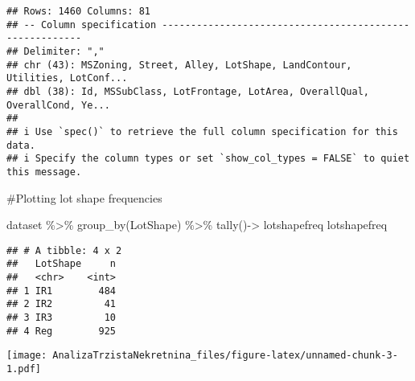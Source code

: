 \documentclass[
]{article}
\newenvironment{Shaded}{\begin{snugshade}}{\end{snugshade}}
\newcommand{\AttributeTok}[1]{\textcolor[rgb]{0.77,0.63,0.00}{#1}}
\newcommand{\FunctionTok}[1]{\textcolor[rgb]{0.00,0.00,0.00}{#1}}
\newcommand{\NormalTok}[1]{#1}
\newcommand{\OtherTok}[1]{\textcolor[rgb]{0.56,0.35,0.01}{#1}}
\newcommand{\SpecialCharTok}[1]{\textcolor[rgb]{0.00,0.00,0.00}{#1}}
\newcommand{\StringTok}[1]{\textcolor[rgb]{0.31,0.60,0.02}{#1}}
\begin{document}
\begin{verbatim}
## Rows: 1460 Columns: 81
## -- Column specification --------------------------------------------------------
## Delimiter: ","
## chr (43): MSZoning, Street, Alley, LotShape, LandContour, Utilities, LotConf...
## dbl (38): Id, MSSubClass, LotFrontage, LotArea, OverallQual, OverallCond, Ye...
## 
## i Use `spec()` to retrieve the full column specification for this data.
## i Specify the column types or set `show_col_types = FALSE` to quiet this message.
\end{verbatim}

\#Plotting lot shape frequencies

\begin{Shaded}
\begin{Highlighting}[]
\NormalTok{dataset }\SpecialCharTok{\%\textgreater{}\%} 
  \FunctionTok{group\_by}\NormalTok{(LotShape) }\SpecialCharTok{\%\textgreater{}\%}
  \FunctionTok{tally}\NormalTok{()}\OtherTok{{-}\textgreater{}}\NormalTok{ lotshapefreq}
\NormalTok{lotshapefreq}
\end{Highlighting}
\end{Shaded}

\begin{verbatim}
## # A tibble: 4 x 2
##   LotShape     n
##   <chr>    <int>
## 1 IR1        484
## 2 IR2         41
## 3 IR3         10
## 4 Reg        925
\end{verbatim}

\begin{Shaded}
\end{Shaded}

\texttt{[image: AnalizaTrzistaNekretnina\_files/figure-latex/unnamed-chunk-3-1.pdf]}

\begin{Shaded}
\end{Shaded}
\end{document}
